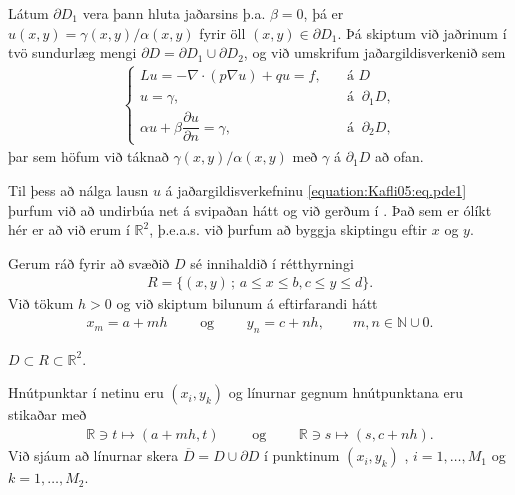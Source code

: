 \documentclass[a4paper,10pt,icelandic]{sphinxmanual}
\begin{document}
Látum \(\partial D_1\) vera þann hluta jaðarsins þ.a. \(\beta=0\), þá er \(u(x,y)=\gamma(x,y)/\alpha(x,y)\) fyrir öll \((x,y)\in \partial D_1\). Þá skiptum við jaðrinum í tvö sundurlæg mengi \(\partial D=\partial D_1\cup \partial D_2\), og við umskrifum jaðargildisverkenið sem
\begin{equation}\label{equation:Kafli05:eq.pde1}
\begin{split}\begin{cases}
Lu=-\nabla\cdot (p\nabla u)+qu=f, \quad &\text{á } D\\
u=\gamma,\quad &\text{á } \ \partial_1 D,\\
\alpha u+\beta\dfrac{\partial u}{\partial n}
=\gamma, \quad  &\text{á } \ \partial_2 D,
\end{cases}\end{split}
\end{equation}
þar sem höfum við táknað \(\gamma(x,y)/\alpha(x,y)\) með \(\gamma\) á \(\partial_1 D\) að ofan.

Til þess að nálga lausn \(u\) á jaðargildisverkefninu \eqref{equation:Kafli05:eq.pde1} þurfum við að undirbúa net á svipaðan hátt og við gerðum í {\hyperref[\detokenize{Kafli05:ch-5-1}]{}}. Það sem er ólíkt hér er að við erum í \(\mathbb R^2\), þ.e.a.s. við þurfum að byggja skiptingu eftir \(x\) og \(y\).


Gerum ráð fyrir að svæðið \(D\) sé innihaldið í rétthyrningi
\begin{equation*}
\begin{split}R=\{(x,y)\,;\, a\leq x\leq b, c\leq y\leq d\}.\end{split}
\end{equation*}
Við tökum \(h>0\) og við skiptum bilunum á eftirfarandi hátt
\begin{equation*}
\begin{split}x_m=a+mh \qquad \text{ og } \qquad y_n=c+nh, \qquad m,n\in {{\mathbb  N}\cup {0}}.\end{split}
\end{equation*}

  \(D \subset R \subset {\mathbb R^2}\).

Hnútpunktar í netinu eru \((x_i, y_k)\) og línurnar gegnum hnútpunktana eru stikaðar með
\begin{equation*}
\begin{split}{{\mathbb  R}}\ni t\mapsto (a+mh,t) \qquad \text{ og } \qquad
{{\mathbb  R}}\ni s\mapsto (s,c+nh).\end{split}
\end{equation*}
Við sjáum að línurnar skera \(\overline D =D\cup\partial D\) í punktinum \((x_i, y_k)\) , \(i=1,\dots, M_1\) og \(k=1,\dots,M_2\).
\end{document}
